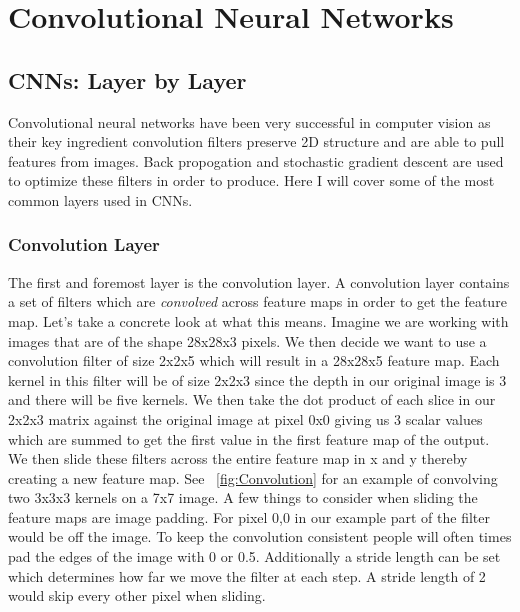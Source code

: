 
\chapter{Convolutional Neural Networks} %

\label{Chapter2}


\section{CNNs: Layer by Layer}

Convolutional neural networks have been very successful in computer vision as their key ingredient convolution filters preserve 2D structure and are able to pull features from images. Back propogation and stochastic gradient descent are used to optimize these filters in order to produce. Here I will cover some of the most common layers used in CNNs.

\subsection{Convolution Layer}

The first and foremost layer is the convolution layer. A convolution layer contains a set of filters which are \textit{convolved} across feature maps in order to get the feature map. Let's take a concrete look at what this means. Imagine we are working with images that are of the shape 28x28x3 pixels. We then decide we want to use a convolution filter of size 2x2x5 which will result in a 28x28x5 feature map. Each kernel in this filter will be of size 2x2x3 since the depth in our original image is 3 and there will be five kernels. We then take the dot product of each slice in our 2x2x3 matrix against the original image at pixel 0x0 giving us 3 scalar values which are summed to get the first value in the first feature map of the output. We then slide these filters across the entire feature map in x and y thereby creating a new feature map.  See ~\ref{fig:Convolution} for an example of convolving two 3x3x3 kernels on a 7x7 image.  A few things to consider when sliding the feature maps are image padding. For pixel 0,0 in our example part of the filter would be off the image. To keep the convolution consistent people will often times pad the edges of the image with 0 or 0.5. Additionally a stride length can be set which determines how far we move the filter at each step. A stride length of 2 would skip every other pixel when sliding.

